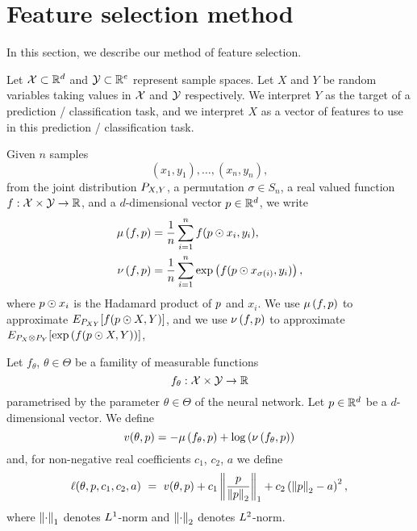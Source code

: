\section{Feature selection method}
In this section,
we describe
our method of feature selection.

Let 
$\spaceX \subset \Rd$
and 
$\spaceY \subset \R^{e}$
represent sample spaces.
Let 
$X$
and 
$Y$
be random variables taking values in 
$\spaceX$
and 
$\spaceY$
respectively.
We interpret $Y$ as 
the target of a
prediction / classification
task,
and
we interpret $X$ as
a vector of features to use in this
prediction / classification
task.

Given $n$ samples
\begin{equation*}
	(x_1, y_1), 
	\dots,
	(x_n, y_n), 
\end{equation*}
from the joint distribution $\Prob_{X, Y}$, 
a permutation $\sigma \in S_n$,
a real valued function $f: \spaceX \times \spaceY \rightarrow \R$,
and
a $d$-dimensional vector $\projection \in \Rd$,
we write
\begin{equation}
	\begin{split}
		\jointeval[f, \projection] &= \frac{1}{n} \sum_{i=1}^{n} f(\projection \hadamard x_i, y_i),
		\\
		\prodeval[f, \projection] &= \frac{1}{n} \sum_{i=1}^{n} \exp\left(f(\projection \hadamard x_{\sigma(i)}, y_i)\right),
	\end{split}
\end{equation}
where
$\projection \hadamard x_i$ 
is the Hadamard product of 
$\projection$ and $x_i$. 
We use 
$\jointeval[f, \projection]$ 
to approximate 
$\Expectation_{\Prob_{XY}}[f(\projection \hadamard X, Y)]$,
and we use
$\prodeval[f, \projection]$ 
to approximate 
$\Expectation_{\Prob_{X} \otimes \Prob_{Y}}[\exp\left(f(\projection \hadamard X, Y)\right)]$,

Let 
$f_\theta$, $\theta \in \Theta$
be a famility of measurable functions
\begin{equation*}
	f_\theta: \spaceX \times \spaceY \rightarrow \R
\end{equation*}
parametrised by the parameter $\theta \in \Theta$ of the neural network.
Let 
$\projection \in \Rd$
be a $d$-dimensional vector. 
We define
\begin{equation}
	\donskervaradhanloss(\theta, \projection) = - \jointeval[f_\theta, \projection] + \log \left(\prodeval[f_\theta, \projection]\right)
\end{equation}
and, 
for 
non-negative real coefficients $c_1$, $c_2$, $a$
we define
\begin{equation}
	\lossfun(\theta, p, c_1, c_2, a)
 \,\,
	=  
 \,\,
	\donskervaradhanloss(\theta, \projection)
		 + 
		c_1 \lonenorm[\frac{\projection}{\ltwonorm[\projection]}]
		 + 
		c_2 \left( \ltwonorm[\projection] - a \right)\squared,
\end{equation}
where 
$\lonenorm$ denotes $\Lone$-norm 
and 
$\ltwonorm$ denotes $\Ltwo$-norm.


